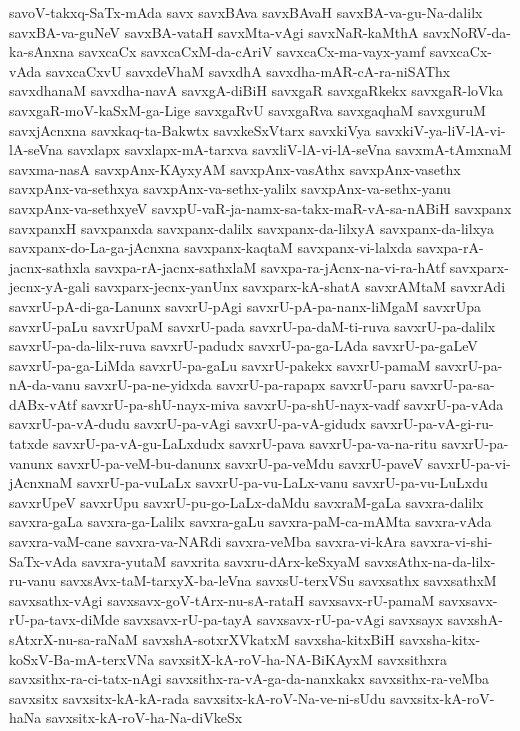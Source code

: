 {savoV-takxq-SaTx-mAda
savx
savxBAva
savxBAvaH
savxBA-va-gu-Na-dalilx
savxBA-va-guNeV
savxBA-vataH
savxMta-vAgi
savxNaR-kaMthA
savxNoRV-da-ka-sAnxna
savxcaCx
savxcaCxM-da-cAriV
savxcaCx-ma-vayx-yamf
savxcaCx-vAda
savxcaCxvU
savxdeVhaM
savxdhA
savxdha-mAR-cA-ra-niSAThx
savxdhanaM
savxdha-navA
savxgA-diBiH
savxgaR
savxgaRkekx
savxgaR-loVka
savxgaR-moV-kaSxM-ga-Lige
savxgaRvU
savxgaRva
savxgaqhaM
savxguruM
savxjAcnxna
savxkaq-ta-Bakwtx
savxkeSxVtarx
savxkiVya
savxkiV-ya-liV-lA-vi-lA-seVna
savxlapx
savxlapx-mA-tarxva
savxliV-lA-vi-lA-seVna
savxmA-tAmxnaM
savxma-nasA
savxpAnx-KAyxyAM
savxpAnx-vasAthx
savxpAnx-vasethx
savxpAnx-va-sethxya
savxpAnx-va-sethx-yalilx
savxpAnx-va-sethx-yanu
savxpAnx-va-sethxyeV
savxpU-vaR-ja-namx-sa-takx-maR-vA-sa-nABiH
savxpanx
savxpanxH
savxpanxda
savxpanx-dalilx
savxpanx-da-lilxyA
savxpanx-da-lilxya
savxpanx-do-La-ga-jAcnxna
savxpanx-kaqtaM
savxpanx-vi-lalxda
savxpa-rA-jacnx-sathxla
savxpa-rA-jacnx-sathxlaM
savxpa-ra-jAcnx-na-vi-ra-hAtf
savxparx-jecnx-yA-gali
savxparx-jecnx-yanUnx
savxparx-kA-shatA
savxrAMtaM
savxrAdi
savxrU-pA-di-ga-Lanunx
savxrU-pAgi
savxrU-pA-pa-nanx-liMgaM
savxrUpa
savxrU-paLu
savxrUpaM
savxrU-pada
savxrU-pa-daM-ti-ruva
savxrU-pa-dalilx
savxrU-pa-da-lilx-ruva
savxrU-padudx
savxrU-pa-ga-LAda
savxrU-pa-gaLeV
savxrU-pa-ga-LiMda
savxrU-pa-gaLu
savxrU-pakekx
savxrU-pamaM
savxrU-pa-nA-da-vanu
savxrU-pa-ne-yidxda
savxrU-pa-rapapx
savxrU-paru
savxrU-pa-sa-dABx-vAtf
savxrU-pa-shU-nayx-miva
savxrU-pa-shU-nayx-vadf
savxrU-pa-vAda
savxrU-pa-vA-dudu
savxrU-pa-vAgi
savxrU-pa-vA-gidudx
savxrU-pa-vA-gi-ru-tatxde
savxrU-pa-vA-gu-LaLxdudx
savxrU-pava
savxrU-pa-va-na-ritu
savxrU-pa-vanunx
savxrU-pa-veM-bu-danunx
savxrU-pa-veMdu
savxrU-paveV
savxrU-pa-vi-jAcnxnaM
savxrU-pa-vuLaLx
savxrU-pa-vu-LaLx-vanu
savxrU-pa-vu-LuLxdu
savxrUpeV
savxrUpu
savxrU-pu-go-LaLx-daMdu
savxraM-gaLa
savxra-dalilx
savxra-gaLa
savxra-ga-Lalilx
savxra-gaLu
savxra-paM-ca-mAMta
savxra-vAda
savxra-vaM-cane
savxra-va-NARdi
savxra-veMba
savxra-vi-kAra
savxra-vi-shi-SaTx-vAda
savxra-yutaM
savxrita
savxru-dArx-keSxyaM
savxsAthx-na-da-lilx-ru-vanu
savxsAvx-taM-tarxyX-ba-leVna
savxsU-terxVSu
savxsathx
savxsathxM
savxsathx-vAgi
savxsavx-goV-tArx-nu-sA-rataH
savxsavx-rU-pamaM
savxsavx-rU-pa-tavx-diMde
savxsavx-rU-pa-tayA
savxsavx-rU-pa-vAgi
savxsayx
savxshA-sAtxrX-nu-sa-raNaM
savxshA-sotxrXVkatxM
savxsha-kitxBiH
savxsha-kitx-koSxV-Ba-mA-terxVNa
savxsitX-kA-roV-ha-NA-BiKAyxM
savxsithxra
savxsithx-ra-ci-tatx-nAgi
savxsithx-ra-vA-ga-da-nanxkakx
savxsithx-ra-veMba
savxsitx
savxsitx-kA-kA-rada
savxsitx-kA-roV-Na-ve-ni-sUdu
savxsitx-kA-roV-haNa
savxsitx-kA-roV-ha-Na-diVkeSx
}

